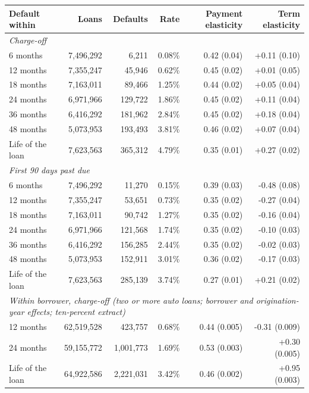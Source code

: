 \begin{tabular}{lrrrrr}
\toprule
Default within & Loans & Defaults & Rate & Payment elasticity & Term elasticity \\
\midrule
\multicolumn{6}{l}{\emph{Charge-off}} \\
6 months & 7,496,292 & 6,211 & 0.08\% & 0.42 (0.04) & +0.11 (0.10) \\
12 months & 7,355,247 & 45,946 & 0.62\% & 0.45 (0.02) & +0.01 (0.05) \\
18 months & 7,163,011 & 89,466 & 1.25\% & 0.44 (0.02) & +0.05 (0.04) \\
24 months & 6,971,966 & 129,722 & 1.86\% & 0.45 (0.02) & +0.11 (0.04) \\
36 months & 6,416,292 & 181,962 & 2.84\% & 0.45 (0.02) & +0.18 (0.04) \\
48 months & 5,073,953 & 193,493 & 3.81\% & 0.46 (0.02) & +0.07 (0.04) \\
Life of the loan & 7,623,563 & 365,312 & 4.79\% & 0.35 (0.01) & +0.27 (0.02) \\
\multicolumn{6}{l}{\emph{First 90 days past due}} \\
6 months & 7,496,292 & 11,270 & 0.15\% & 0.39 (0.03) & -0.48 (0.08) \\
12 months & 7,355,247 & 53,651 & 0.73\% & 0.35 (0.02) & -0.27 (0.04) \\
18 months & 7,163,011 & 90,742 & 1.27\% & 0.35 (0.02) & -0.16 (0.04) \\
24 months & 6,971,966 & 121,568 & 1.74\% & 0.35 (0.02) & -0.10 (0.03) \\
36 months & 6,416,292 & 156,285 & 2.44\% & 0.35 (0.02) & -0.02 (0.03) \\
48 months & 5,073,953 & 152,911 & 3.01\% & 0.36 (0.02) & -0.17 (0.03) \\
Life of the loan & 7,623,563 & 285,139 & 3.74\% & 0.27 (0.01) & +0.21 (0.02) \\
\midrule
\multicolumn{6}{l}{\emph{Within borrower, charge-off (two or more auto loans; borrower and origination-year effects; ten-percent extract)}} \\
12 months & 62,519,528 & 423,757 & 0.68\% & 0.44 (0.005) & -0.31 (0.009) \\
24 months & 59,155,772 & 1,001,773 & 1.69\% & 0.53 (0.003) & +0.30 (0.005) \\
Life of the loan & 64,922,586 & 2,221,031 & 3.42\% & 0.46 (0.002) & +0.95 (0.003) \\
\bottomrule
\end{tabular}
